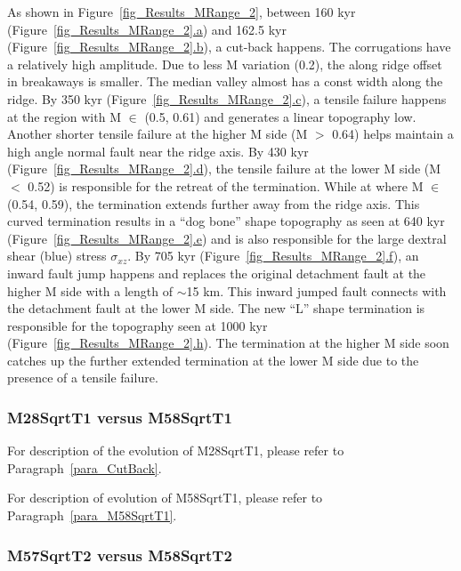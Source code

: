 As shown in Figure~\hyperref[fig_Results_MRange_2]{\ref{fig_Results_MRange_2}}, between 160 kyr (Figure~\hyperref[fig_Results_MRange_2]{\ref{fig_Results_MRange_2}.a}) and 162.5 kyr (Figure~\hyperref[fig_Results_MRange_2]{\ref{fig_Results_MRange_2}.b}), a cut-back happens. The corrugations have a relatively high amplitude. Due to less M variation (0.2), the along ridge offset in breakaways is smaller. The median valley almost has a const width along the ridge. By 350 kyr (Figure~\hyperref[fig_Results_MRange_2]{\ref{fig_Results_MRange_2}.c}), a tensile failure happens at the region with M $\in$ (0.5, 0.61) and generates a linear topography low. Another shorter tensile failure at the higher M side (M $>$ 0.64) helps maintain a high angle normal fault near the ridge axis. By 430 kyr (Figure~\hyperref[fig_Results_MRange_2]{\ref{fig_Results_MRange_2}.d}), the tensile failure at the lower M side (M $<$ 0.52) is responsible for the retreat of the termination. While at where M $\in$ (0.54, 0.59), the termination extends further away from the ridge axis. This curved termination results in a ``dog bone'' shape topography as seen at 640 kyr (Figure~\hyperref[fig_Results_MRange_2]{\ref{fig_Results_MRange_2}.e}) and is also responsible for the large dextral shear (blue) stress $\sigma_{xz}$. By 705 kyr (Figure~\hyperref[fig_Results_MRange_2]{\ref{fig_Results_MRange_2}.f}), an inward fault jump happens and replaces the original detachment fault at the higher M side with a length of $\sim$15 km. This inward jumped fault connects with the detachment fault at the lower M side. The new ``L'' shape termination is responsible for the topography seen at 1000 kyr (Figure~\hyperref[fig_Results_MRange_2]{\ref{fig_Results_MRange_2}.h}). The termination at the higher M side soon catches up the further extended termination at the lower M side due to the presence of a tensile failure.
       
\subsubsection{M28SqrtT1 versus M58SqrtT1}

For description of the evolution of M28SqrtT1, please refer to Paragraph~\hyperref[para_CutBack]{\ref{para_CutBack}}.

For description of evolution of M58SqrtT1, please refer to Paragraph~\hyperref[para_M58SqrtT1]{\ref{para_M58SqrtT1}}.

\subsubsection{M57SqrtT2 versus M58SqrtT2}

